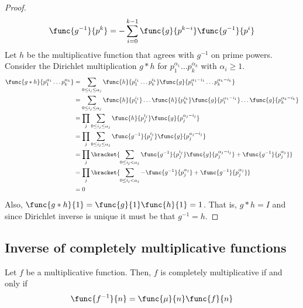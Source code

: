 \begin{proof}
\begin{align*}
        \func{g^{-1}}{p^k} = - \sum_{i = 0}^{k-1} \func{g}{p^{k-i}} \func{g^{-1}}{p^{i}}
    \end{align*}
    Let \(h\) be the multiplicative function that agrees with \(g^{-1}\) on prime powers. Consider the Dirichlet multiplication \(g \ast h\) for \(p_1^{\alpha_1} \dots p_k^{\alpha_k}\) with \(\alpha_i \geq 1\).
    \begin{align*}
        \func{g \ast h}{p_1^{\alpha_1} \dots p_k^{\alpha_k}} &= \sum_{ 0 \leq  i_j \leq \alpha_j} \func{h}{p_1^{i_1} \dots p_k^{i_k} } \func{g}{p_1^{\alpha_1 - i_1} \dots p_k^{\alpha_k  - i_k} }\\
        &= \sum_{ 0 \leq  i_j \leq \alpha_j} \func{h}{p_1^{i_1}} \dots\func{h}{ p_k^{i_k} } \func{g}{p_1^{\alpha_1 - i_1}} \dots \func{g}{p_k^{\alpha_k  - i_k} }\\
        &=  \prod_j \sum_{ 0 \leq  i_j \leq \alpha_j} \func{h}{p_j^{i_j}}\func{g}{p_j^{\alpha_j - i_j}}\\
        &=  \prod_j \sum_{ 0 \leq  i_j \leq \alpha_j} \func{g^{-1}}{p_j^{i_j}}\func{g}{p_j^{\alpha_j - i_j}}\\
        &=  \prod_j \bracket{\sum_{ 0 \leq  i_j < \alpha_j} \func{g^{-1}}{p_j^{i_j}}\func{g}{p_j^{\alpha_j - i_j}} + \func{g^{-1}}{p_j^{\alpha_j}}}\\
        &=  \prod_j \bracket{\sum_{ 0 \leq  i_j < \alpha_j} - \func{g^{-1}}{p_j^{\alpha_j}} + \func{g^{-1}}{p_j^{\alpha_j}}}\\
        &= 0
    \end{align*}
    Also, \(\func{g \ast h}{1} = \func{g}{1} \func{h}{1} = 1\). That is, \(g \ast h = I\) and since Dirichlet inverse is unique it must be that \(g^{-1} = h\).
\end{proof}

\subsection{Inverse of completely multiplicative functions}
\begin{theorem}
    Let \(f\) be a multiplicative function. Then, \(f\) is completely multiplicative if and only if 
    \begin{equation*}
        \func{f^{-1}}{n} = \func{\mu}{n} \func{f}{n}
    \end{equation*}
\end{theorem}

